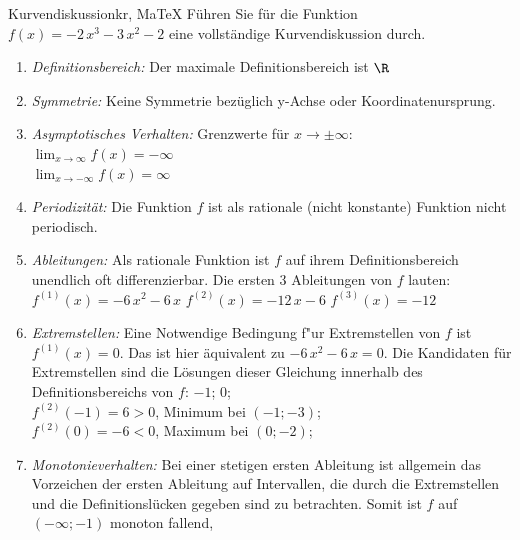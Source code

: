  \providecommand{\MoIl}{(} 
 \providecommand{\MoIr}{)}
 \providecommand{\MIntvlSep}{;} 
 \providecommand{\MElSetSep}{;} 
 \begin{MAufgabe}{Kurvendiskussion}{kr, MaTeX}
 F\"uhren Sie f\"ur die Funktion $f(x)= - 2\, x^3 - 3\, x^2 - 2$ eine vollst\"andige Kurvendiskussion durch.\\ 
 \ifLsg\Loesung
 \begin{enumerate}
 \item \emph{Definitionsbereich:} 
 Der maximale Definitionsbereich ist $\R$\item \emph{Symmetrie:} 
 Keine Symmetrie bez\"uglich y-Achse oder Koordinatenursprung.\item \emph{Asymptotisches Verhalten:} 
 Grenzwerte f\"ur $x\rightarrow \pm \infty$: \\ 
 $\lim_{x\rightarrow \infty} f(x)=- \infty$ \\ 
 $\lim_{x\rightarrow -\infty} f(x)=\infty$ \\ 
 \item \emph{Periodizit\"at:} 
 Die Funktion $f$ ist als rationale (nicht konstante) Funktion nicht periodisch.\item \emph{Ableitungen:} 
 Als rationale Funktion ist $f$ auf ihrem Definitionsbereich unendlich oft differenzierbar. 
 Die ersten 3 Ableitungen von $f$ lauten: \\ 
 $f^{(1)}(x)= - 6\, x^2 - 6\, x$\newline 
  $f^{(2)}(x)= - 12\, x - 6$\newline 
  $f^{(3)}(x)=-12$\newline 
  \item \emph{Extremstellen:} 
 Eine Notwendige Bedingung f"ur Extremstellen von $f$ ist $f^{(1)}(x)=0$. 
 Das ist hier \"aquivalent zu $ - 6\, x^2 - 6\, x=0$. 
 Die Kandidaten f\"ur Extremstellen sind die L\"osungen dieser Gleichung innerhalb des Definitionsbereichs von $f$: $-1$; $0$; \\ 
 $f^{(2)}(-1)=6$$>0$, Minimum bei $(-1;-3)$; \\ 
 $f^{(2)}(0)=-6$$<0$, Maximum bei $(0;-2)$; \\ 
 \item \emph{Monotonieverhalten:} 
 Bei einer stetigen ersten Ableitung ist allgemein das Vorzeichen der ersten Ableitung auf Intervallen, die durch die Extremstellen und die Definitionsl\"ucken gegeben sind zu betrachten. Somit ist $f$ auf \\ 
 $\MoIl-\infty\MIntvlSep-1\MoIr$ monoton fallend, \\ 

\end{enumerate}
\end{MAufgabe}
